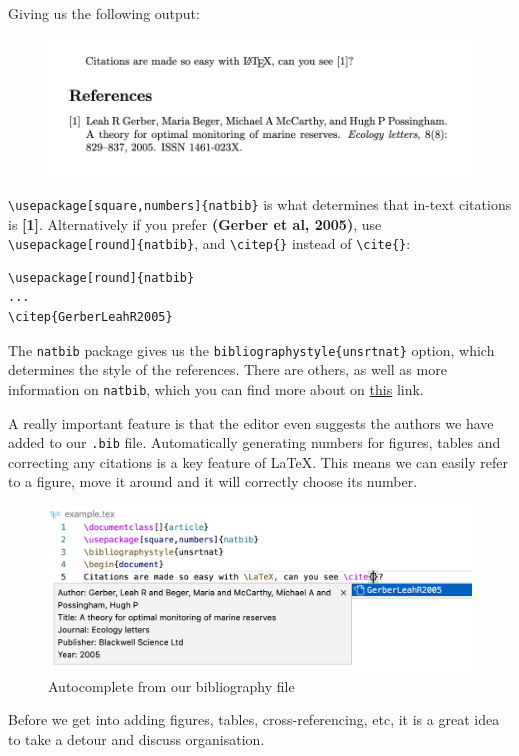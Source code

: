 Giving us the following output:
\begin{figure}[h]
  \centering
    \includegraphics[]{figures/references.png}
  \label{fig:references}
\end{figure}

\verb|\usepackage[square,numbers]{natbib}| is what determines that in-text citations is \textbf{[1]}.
Alternatively if you prefer \textbf{(Gerber et al, 2005)}, use \verb|\usepackage[round]{natbib}|, and \verb|\citep{}| instead of \texttt{\textbackslash cite\{\}}:
\begin{lstlisting}
\usepackage[round]{natbib}
...
\citep{GerberLeahR2005}
\end{lstlisting}

The \verb|natbib| package gives us the \verb|bibliographystyle{unsrtnat}| option, which determines the style of the references.
There are others, as well as more information on \verb|natbib|, which you can find more about on \href{https://ftp.eq.uc.pt/software/TeX/macros/latex/contrib/natbib/natnotes.pdf}{this} link. 

A really important feature is that the editor even suggests the authors we have added to our \verb|.bib| file.
Automatically generating numbers for figures, tables and correcting any citations is a key feature of LaTeX.
This means we can easily refer to a figure, move it around and it will correctly choose its number.
\begin{figure}[h]
  \centering
  \includegraphics[width=\textwidth]{figures/intellisense.png}
  \caption{Autocomplete from our bibliography file}
  \label{fig:intellisense}
\end{figure}

Before we get into adding figures, tables, cross-referencing, etc, it is a great idea to take a detour and discuss organisation.